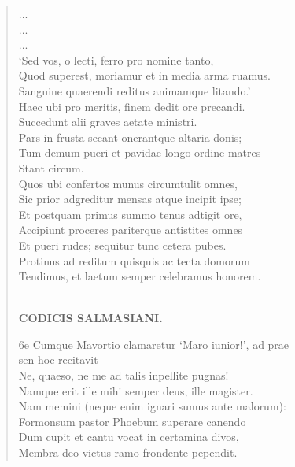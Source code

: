 \documentclass[11pt, a4paper]{report}
\begin{document}
\begin{verse}
                     \lbrack ... \rbrack 
                 \\ 
                     \lbrack ... \rbrack 
                 \\ 
                     \lbrack ... \rbrack 
                 \\ ‘Sed vos, o lecti, ferro pro nomine tanto, \\ Quod superest, moriamur et in media arma ruamus. \\ Sanguine quaerendi reditus animamque litando.’ \\ Haec ubi pro meritis, finem dedit ore precandi. \\ Succedunt alii graves aetate ministri. \\ Pars in frusta secant onerantque altaria donis; \\ Tum demum pueri et pavidae longo ordine matres \\ Stant circum. \\ Quos ubi confertos munus circumtulit omnes, \\ Sic prior adgreditur mensas atque incipit ipse; \\ Et postquam primus summo tenus adtigit ore, \\ Accipiunt proceres pariterque antistites omnes \\ Et pueri rudes; sequitur tunc cetera pubes. \\ Protinus ad reditum quisquis ac tecta domorum \\ Tendimus, et laetum semper celebramus honorem. \\ 
        ﻿\pagebreak 
    \begin{center} \textbf{CODICIS SALMASIANI.} \end{center} \marginpar{[61]}  \lbrack 6e Cumque Mavortio clamaretur ‘Maro iunior!’, ad prae \\ sen hoc recitavit \\ Ne, quaeso, ne me ad talis inpellite pugnas! \\ Namque erit ille mihi semper deus, ille magister. \\ Nam memini (neque enim ignari sumus ante malorum): \\ Formonsum pastor Phoebum superare canendo \\ Dum cupit et cantu vocat in certamina divos, \\ Membra deo victus ramo frondente pependit. \\ 
      \end{verse}
  
\end{document}
